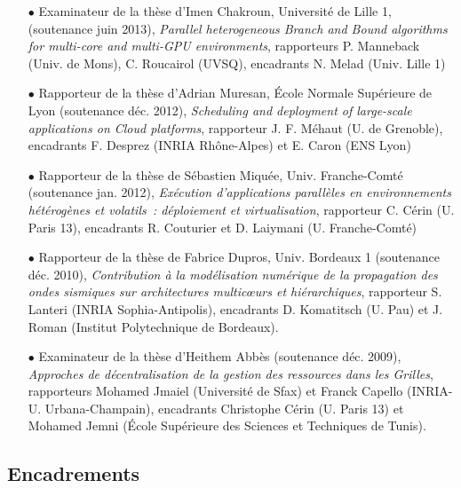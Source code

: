 \documentclass[11pt]{article}
\begin{document}
\begin{itemize}

\item[$\bullet$] 
Examinateur de la thèse d'Imen Chakroun, Université de Lille 1,
(soutenance juin 2013), \textit{Parallel heterogeneous Branch and Bound algorithms for multi-core and multi-GPU environments},
rapporteurs P. Manneback (Univ. de Mons), C. Roucairol (UVSQ), 
encadrants N. Melad (Univ. Lille 1)\\

\item[$\bullet$] 
Rapporteur de la thèse d'Adrian Muresan, \'Ecole Normale Supérieure de Lyon
(soutenance déc. 2012), \textit{Scheduling and deployment of large-scale applications on 
Cloud platforms},
rapporteur J. F. Méhaut (U. de Grenoble), 
encadrants F. Desprez (INRIA Rhône-Alpes) et E. Caron (ENS Lyon)\\
\item[$\bullet$] 
Rapporteur de la thèse de Sébastien Miquée, Univ. Franche-Comté (soutenance 
jan. 2012), \textit{Exécution d'applications parallèles en environnements 
hétérogènes et volatils~: déploiement et virtualisation},
rapporteur C. Cérin (U. Paris 13), 
encadrants R. Couturier et D. Laiymani (U. Franche-Comté)\\
\item[$\bullet$] 
Rapporteur de la thèse de Fabrice Dupros, Univ. Bordeaux 1 (soutenance déc. 2010), 
\textit{Contribution à la modélisation numérique de la propagation des ondes 
sismiques sur architectures multic{\oe}urs et hiérarchiques},
rapporteur S. Lanteri (INRIA Sophia-Antipolis), 
encadrants D. Komatitsch (U. Pau) et J. Roman (Institut Polytechnique de 
Bordeaux).\\

\item[$\bullet$] 
Examinateur de la thèse d'Heithem Abbès (soutenance déc. 2009), 
\textit{Approches de décentralisation de la gestion des ressources dans les 
Grilles}, rapporteurs Mohamed Jmaiel (Université de Sfax) et Franck Capello 
(INRIA-U. Urbana-Champain), encadrants Christophe Cérin (U. Paris 13) et 
Mohamed Jemni (École Supérieure des Sciences et Techniques de Tunis).
\end{itemize}




\subsection{Encadrements}
\end{document}
